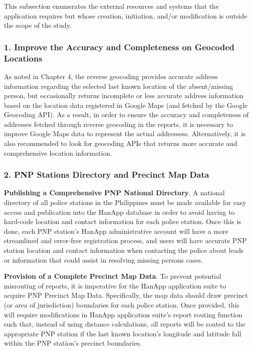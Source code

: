 This subsection enumerates the external resources and systems that the application requires but whose creation, initiation, and/or modification is outside the scope of the study. 

\subsubsection{1. Improve the Accuracy and Completeness on Geocoded Locations}

As noted in Chapter 4, the reverse geocoding provides accurate address information regarding the selected last known location of the absent/missing person, but occasionally returns incomplete or less accurate address information based on the location data registered in Google Maps (and fetched by the Google Geocoding API). As a result, in order to ensure the accuracy and completeness of addresses  fetched through reverse geocoding in the reports, it is necessary to improve Google Maps data to represent the actual addressess. Alternatively, it is also  recommended to look for geocoding APIs that returns more accurate and comprehensive location information.

\subsubsection{2. PNP Stations Directory and Precinct Map Data} 

\textbf{Publishing a Comprehensive PNP National Directory}. A national directory of all police stations in the Philippines must be made available for easy access and publication into the HanApp database in order to avoid having to hard-code location and contact information for each police station. Once this is done, each PNP station's HanApp administrative account will have a more streamlined and error-free registration process, and users will have accurate PNP station location and contact information when contacting the police about leads or information that could assist in resolving missing persons cases.

\textbf{Provision of a Complete Precinct Map Data}. To prevent potential misrouting of reports, it is imperative for the HanApp application suite to acquire PNP Precinct Map Data. Specifically, the map data should draw precinct (or area of jurisdiction) boundaries for each police station. Once provided, this will require modifications in HanApp application suite’s report routing function such that, instead of using distance calculations, all reports will be routed to the appropriate PNP station if the last known location’s longitude and latitude fall within the PNP station’s precinct boundaries.

